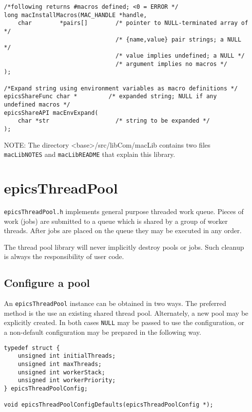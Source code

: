 \begin{verbatim}
/*following returns #macros defined; <0 = ERROR */
long macInstallMacros(MAC_HANDLE *handle,
    char        *pairs[]        /* pointer to NULL-terminated array of */
                                /* {name,value} pair strings; a NULL */
                                /* value implies undefined; a NULL */
                                /* argument implies no macros */
);

/*Expand string using environment variables as macro definitions */
epicsShareFunc char *         /* expanded string; NULL if any undefined macros */
epicsShareAPI macEnvExpand(
    char *str                   /* string to be expanded */
);
\end{verbatim}

NOTE: The directory \textless{}base\textgreater{}/src/libCom/macLib contains two files \verb|macLibNOTES| and \verb|macLibREADME| that explain this library.

\section{epicsThreadPool}


\verb|epicsThreadPool.h| implements general purpose threaded work queue.
Pieces of work (jobs) are submitted to a queue which is shared by a group of worker threads.
After jobs are placed on the queue they may be executed in any order.

The thread pool library will never implicitly destroy pools or jobs.
Such cleanup is always the responsibility of user code.

\subsection{Configure a pool}

An \verb|epicsThreadPool| instance can be obtained in two ways. The preferred
method is the use an existing shared thread pool. Alternately, a new
pool may be explicitly created. In both cases \verb|NULL| may be passed to use
the configuration, or a non-default configuration may be prepared in the following way.

\begin{verbatim}
typedef struct {
    unsigned int initialThreads;
    unsigned int maxThreads;
    unsigned int workerStack;
    unsigned int workerPriority;
} epicsThreadPoolConfig;

void epicsThreadPoolConfigDefaults(epicsThreadPoolConfig *);
\end{verbatim}

